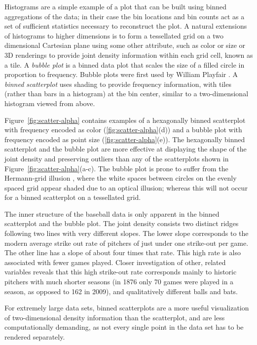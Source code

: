 \documentclass[11pt]{isuthesis}\usepackage[]{graphicx}\usepackage[]{color}
\begin{document}
Histograms are a simple example of a plot that can be built using binned aggregations of the data; in their case the bin locations and bin counts act as a set of sufficient statistics necessary to reconstruct the plot. A natural extensions of histograms to higher dimensions is to form a tessellated grid on a two dimensional Cartesian plane using some other attribute, such as color or size or 3D renderings to provide joint density information within each grid cell, known as a tile.  A \textit{bubble plot} is a binned data plot that scales the size of a filled circle in proportion to frequency.  Bubble plots were first used by William Playfair \citep{playfair, playfair2}. A {\it binned scatterplot} uses shading to provide frequency information, with tiles (rather than bars in a histogram) at the bin center, similar to a two-dimensional histogram viewed from above.

Figure~\ref{fig:scatter-alpha} contains examples of a hexagonally binned scatterplot with frequency encoded as color (\ref{fig:scatter-alpha}(d)) and a bubble plot with frequency encoded as point size (\ref{fig:scatter-alpha}(e)). The hexagonally binned scatterplot and the bubble plot are more effective at displaying the shape of the joint density and preserving outliers than any of the scatterplots shown in Figure~\ref{fig:scatter-alpha}(a-c). The bubble plot is prone to suffer from the Hermann-grid illusion \citep{hermann:1870}, where the white spaces between circles on the evenly spaced grid appear shaded due to an optical illusion; whereas this will not occur for a binned scatterplot on a tessellated grid. 

The inner structure of the baseball data is only apparent in the binned scatterplot and the bubble plot. The joint density consists two distinct ridges following two lines with very different slopes. The lower slope corresponds to the modern average strike out rate of pitchers of just under one strike-out per game. The other line has a slope of about four times that rate. This high rate is also associated with fewer games played. Closer investigation of other, related variables reveals that this high strike-out rate corresponds mainly to historic pitchers with much shorter seasons (in 1876 only 70 games were played in a season, as opposed to 162 in 2009), and qualitatively different balls and bats.

For extremely large data sets, binned scatterplots are a more useful visualization of two-dimensional density information than the scatterplot, and are less computationally demanding, as not every single point in the data set has to be rendered separately. 
\end{document}
